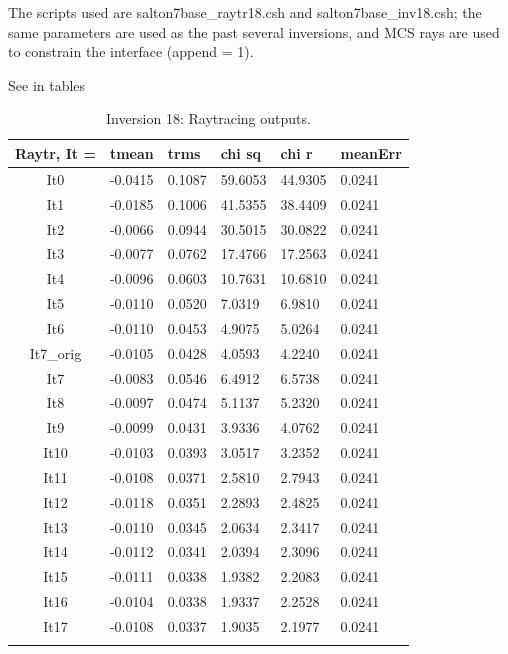 \documentclass[fontsize=11pt, %
                             paper=a4, %
                             twoside, %
                             captions=tableheading,
                             index=totoc,
                             hyperref]{labbook}
\begin{document}
\begin{addmargin}[4cm]{0cm}
The scripts used are salton7base\_raytr18.csh and salton7base\_inv18.csh; the same parameters are used as the past several inversions, and MCS rays are used to constrain the interface (append = 1).  

See in tables 

\begin{table}[!ht]
\label{tab:r18}
\raggedleft
\begin{tabular}{c l l l l l}
\toprule
\textbf{Raytr, It = } & \textbf{tmean} & \textbf{trms} & \textbf{chi sq} & \textbf{chi r} & \textbf{meanErr} \\
\toprule
It0 & -0.0415 & 0.1087 & 59.6053 & 44.9305 & 0.0241\\
It1 & -0.0185 & 0.1006 & 41.5355 & 38.4409 & 0.0241\\
It2 & -0.0066 & 0.0944 & 30.5015 & 30.0822 & 0.0241\\
It3 & -0.0077 & 0.0762 & 17.4766 & 17.2563 & 0.0241\\
It4 & -0.0096 & 0.0603 & 10.7631 & 10.6810 & 0.0241\\
It5 & -0.0110 & 0.0520 & 7.0319 & 6.9810 & 0.0241\\
It6 & -0.0110 & 0.0453 & 4.9075 & 5.0264 & 0.0241\\
It7\_orig & -0.0105 & 0.0428 & 4.0593 & 4.2240 & 0.0241\\
It7 & -0.0083 & 0.0546 & 6.4912 & 6.5738 & 0.0241\\
It8 & -0.0097 & 0.0474 & 5.1137 & 5.2320 & 0.0241\\
It9 & -0.0099 & 0.0431 & 3.9336 & 4.0762 & 0.0241\\
It10 & -0.0103 & 0.0393 & 3.0517 & 3.2352 & 0.0241\\
It11 & -0.0108 & 0.0371 & 2.5810 & 2.7943 & 0.0241\\
It12 & -0.0118 & 0.0351 & 2.2893 & 2.4825 & 0.0241\\
It13 & -0.0110 & 0.0345 & 2.0634 & 2.3417 & 0.0241\\
It14 & -0.0112 & 0.0341 & 2.0394 & 2.3096 & 0.0241\\
It15 & -0.0111 & 0.0338 & 1.9382 & 2.2083 & 0.0241\\
It16 & -0.0104 & 0.0338 & 1.9337 & 2.2528 & 0.0241\\
It17 & -0.0108 & 0.0337 & 1.9035 & 2.1977 & 0.0241\\
\bottomrule\\
\end{tabular}
\caption{Inversion 18: Raytracing outputs.}
\end{table}


\end{addmargin}
\end{document}
